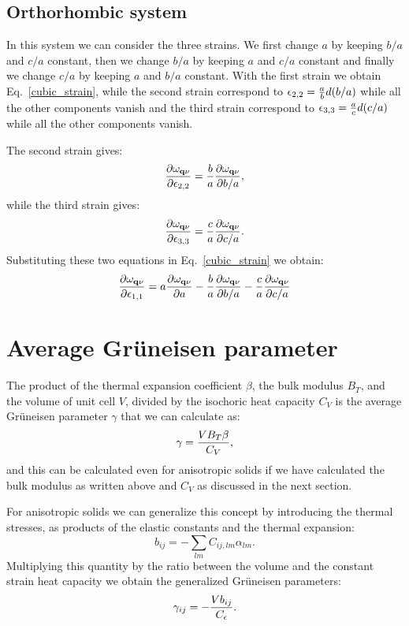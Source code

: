 \documentclass[12pt,a4paper]{article}
\begin{document}
\subsection{\color{web-blue}Orthorhombic system}
In this system we can consider the three strains. We first change $a$
by keeping $b/a$ and $c/a$ constant, then we change $b/a$ by keeping $a$
and $c/a$ constant and finally we change $c/a$ by keeping $a$ and $b/a$ 
constant. With the first strain we obtain Eq.~\ref{cubic_strain}, while
the second strain correspond to
$\epsilon_{2,2}= {a \over b} d (b/a) $ while all the other
components vanish and the third strain correspond to 
$\epsilon_{3,3}= {a \over c} d (c/a) $ while all the other
components vanish.

The second strain gives:
\begin{equation}
{\partial \omega_{{\bf q}\nu} \over \partial \epsilon_{2,2}} = 
{b\over a} {\partial \omega_{{\bf q}\nu} \over \partial b/a},
\end{equation}
while the third strain gives:
\begin{equation}
{\partial \omega_{{\bf q}\nu} 
\over \partial \epsilon_{3,3}} = {c\over a} {\partial \omega_{{\bf q}\nu} 
\over \partial c/a}.
\end{equation}
Substituting these two equations in Eq.~\ref{cubic_strain} we obtain:
\begin{equation}
{\partial \omega_{{\bf q}\nu} \over \partial \epsilon_{1,1}} 
 = a {\partial \omega_{{\bf q}\nu} \over \partial a} - 
{b\over a} {\partial \omega_{{\bf q}\nu} 
\over \partial b/a} - {c\over a} {\partial \omega_{{\bf q}\nu} 
\over \partial c/a}
\end{equation}
%
\newpage
\section{\color{coral}Average Gr\"uneisen parameter}

The product of the thermal expansion coefficient $\beta$, the bulk modulus
$B_T$, and the volume of unit cell $V$, divided by the isochoric
heat capacity $C_V$ is the average Gr\"uneisen parameter $\gamma$
that we can calculate as:
\begin{equation}
\gamma = {V B_T \beta \over C_V},
\end{equation}
and this can be calculated even for anisotropic solids if we have
calculated the bulk modulus as written above and $C_V$ as discussed in
the next section.

For anisotropic solids we can generalize this concept by introducing
the thermal stresses, as products of the elastic constants and the
thermal expansion:
\begin{equation}
b_{ij} = -\sum_{lm} C_{ij,lm} \alpha_{lm}.
\end{equation}
Multiplying this quantity by the ratio between the volume and the
constant strain heat capacity we obtain the generalized Gr\"uneisen
parameters:
\begin{equation}
\gamma_{ij} = - {V b_{ij} \over C_\epsilon}.
\end{equation}
\end{document}
